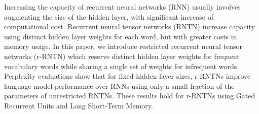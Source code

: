 Increasing the capacity of recurrent neural networks (RNN) usually involves augmenting the size of the hidden layer,  with significant increase of computational cost. Recurrent neural tensor networks (RNTN) increase capacity using  distinct hidden layer weights for each word, but with greater costs in memory usage. In this paper, we introduce restricted recurrent neural tensor networks (r-RNTN) which reserve distinct hidden layer weights for frequent vocabulary words while sharing a single set of weights for infrequent words. Perplexity evaluations show that for fixed hidden layer sizes, r-RNTNs improve language model performance over RNNs using only a small fraction of the parameters of unrestricted RNTNs. These results hold for r-RNTNs using Gated Recurrent Units and Long Short-Term Memory.
